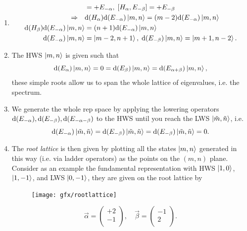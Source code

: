 \begin{enumerate}
	\item \begin{align*}
	[H_\beta,E_{-\alpha}]&= +E_{-\alpha},\; [H_\alpha,E_{-\beta}] = +E_{-\beta}\\
	\Rightarrow \quad &\md(H_\alpha)\md(E_{-\alpha}) \ket{m,n} = (m-2) \md(E_{-\alpha}) \ket{m,n}\\
	\md(H_\beta) \md(E_{-\alpha}) \ket{m,n} &= (n+1) \md(E_{-\alpha}) \ket{m,n}\\
	\md(E_{-\alpha}) \ket{m,n} &= \ket{m-2,n+1},\; \md(E_{-\beta}) \ket{m,n} = \ket{m+1,n-2}.
	\end{align*}
\item The HWS $\ket{m,n}$ is given such that
\begin{equation*}
	\mathrm{d}(E_\alpha)\ket{m,n} =0=\mathrm{d}(E_\beta) \ket{m,n} =\mathrm{d}(E_{\alpha+\beta}) \ket{m,n},
\end{equation*}
these simple roots allow us to span the whole lattice of eigenvalues, i.e. the spectrum.
\item We generate the whole rep space by applying the lowering operators $\mathrm{d}(E_{-\alpha}),\mathrm{d}(E_{-\beta}),\mathrm{d}(E_{-\alpha-\beta})$ to the HWS until you reach the LWS $\ket{\tilde{m},\tilde{n}}$, i.e.
\begin{equation*}
	\mathrm{d}(E_{-\alpha}) \ket{\tilde{m},\tilde{n}} = \mathrm{d}(E_{-\beta}) \ket{\tilde{m},\tilde{n}} = \mathrm{d}(E_{-\beta}) \ket{\tilde{m},\tilde{n}} =0.
\end{equation*}
\item The \emph{root lattice} is then given by plotting all the states $\ket{m,n}$ generated in this way (i.e. via ladder operators) as the points on the $(m,n)$ plane. Consider as an example the fundamental representation with HWS $\ket{1,0}$, $\ket{1,-1}$, and LWS $\ket{0,-1}$, they are given on the root lattice by
\begin{figure}[h!]
	\centering
	\texttt{[image: gfx/rootlattice]}
	\caption{}
	\label{fig:rootlattice}
\end{figure} 
\begin{equation*}
\vec{\alpha}=\begin{pmatrix}
	+2 \\
	-1\\
\end{pmatrix},
\quad  \vec{\beta}=\begin{pmatrix}
	-1 \\
	2\\
\end{pmatrix}.
\end{equation*} 

\end{enumerate}
